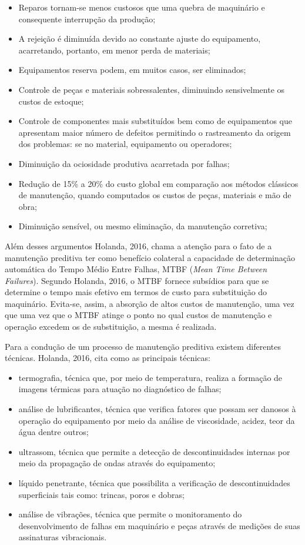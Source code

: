 \documentclass[
	12pt,				
	oneside,			
	a4paper,			
	english,			
	brazil,			
	]{abntex2ppgsi}
\begin{document}
\begin{itemize}
	\item Reparos tornam-se menos custosos que uma quebra de maquinário e consequente interrupção da produção;
	\item A rejeição é diminuída devido ao constante ajuste do equipamento, acarretando, portanto, em menor perda de materiais;
	\item Equipamentos reserva podem, em muitos casos, ser eliminados;
	\item Controle de peças e materiais sobressalentes, diminuindo sensivelmente os custos de estoque;
	\item Controle de componentes mais substituídos bem como de equipamentos que apresentam maior número de defeitos permitindo o rastreamento da origem dos problemas: se no material, equipamento ou operadores;
	\item Diminuição da ociosidade produtiva acarretada por falhas;
	\item Redução de 15\% a 20\% do custo global em comparação aos métodos clássicos de manutenção, quando computados os custos de peças, materiais e mão de obra;
	\item Diminuição sensível, ou mesmo eliminação, da manutenção corretiva;
\end{itemize}

Além desses argumentos Holanda, 2016, chama a atenção para o fato de a manutenção preditiva ter como benefício colateral a capacidade de determinação automática do Tempo Médio Entre Falhas, MTBF (\textit{Mean Time Between Failures}). Segundo Holanda, 2016, o MTBF fornece subsídios para que se determine o tempo mais efetivo em termos de custo para substituição do maquinário. Evita-se, assim, a absorção de altos custos de manutenção, uma vez que uma vez que o MTBF atinge o ponto no qual custos de manutenção e operação excedem os de substituição, a mesma é realizada. 

Para a condução de um processo de manutenção preditiva existem diferentes técnicas. Holanda, 2016, cita como as principais técnicas: 
\begin{itemize}
	\item termografia, técnica que, por meio de temperatura, realiza a formação de imagens térmicas para atuação no diagnóstico de falhas; 
	\item análise de lubrificantes, técnica que verifica fatores que possam ser danosos à operação do equipamento por meio da análise de viscosidade, acidez, teor da água dentre outros; 
	\item ultrassom, técnica que permite a detecção de descontinuidades internas por meio da propagação de ondas através do equipamento; 
	\item líquido penetrante, técnica que possibilita a verificação de descontinuidades superficiais tais como: trincas, poros e dobras; 
	\item análise de vibrações, técnica que permite o monitoramento do desenvolvimento de falhas em maquinário e peças através de medições de suas assinaturas vibracionais. 
\end{itemize}
\end{document}
